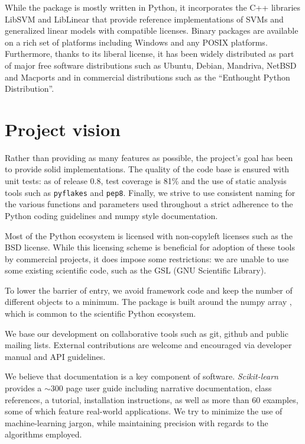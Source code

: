 \documentclass[twoside,11pt]{article}
\begin{document}
While the package is mostly written in Python, it incorporates the C++
libraries LibSVM \citep{chang2001} and LibLinear \citep{fan2008} that
provide reference implementations of SVMs and generalized linear models
with compatible licenses.
%
Binary packages are available on a rich set of platforms including
Windows and any POSIX platforms. Furthermore, thanks to its liberal
license, it has been widely distributed as part
of major free software distributions such as Ubuntu, Debian, Mandriva,
NetBSD and Macports and in commercial distributions such as the ``Enthought
Python Distribution''.


\section {Project vision}

%
Rather than providing as many features as possible, the project's goal has been to provide solid
implementations. The quality of the code base is ensured with unit
tests: as of release 0.8, test coverage is 81\% and the use of static
analysis tools such as {\tt pyflakes} and {\tt pep8}. Finally, we
strive to use consistent naming for the various functions and
parameters used throughout a strict adherence to the Python coding
guidelines and numpy style documentation.

\smallskip {}
%
Most of the Python ecosystem is licensed with non-copyleft licenses such
as the BSD license. While this licensing scheme is beneficial for adoption
of these tools by commercial
projects, it does impose some restrictions: we are unable to use some existing
scientific code, such as the GSL (GNU Scientific Library).

\smallskip {}
%
To lower the barrier of entry, we avoid framework code and keep the number
of different objects to a minimum.
The package is built
around the numpy array \citep{Vanderwalt2011}, which is common to the
scientific Python ecosystem.

\smallskip
{}
%
We base our development on collaborative tools such as git, github and
public mailing lists. External contributions are welcome and
encouraged via developer manual and API guidelines.

\smallskip {}
%
We believe that documentation is a key component of software.
\emph{Scikit-learn} provides a $\sim$300 page user guide including
narrative documentation, class references, a tutorial, installation
instructions, as well as more than 60 examples, some of which feature
real-world applications. We try to minimize the use of
machine-learning jargon, while maintaining precision with
regards to the algorithms employed.
\end{document}
